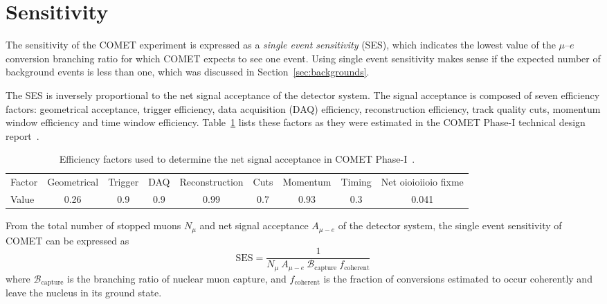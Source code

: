 
\section{Sensitivity}\label{sec:SES}

The sensitivity of the COMET experiment is expressed as a \emph{single event
sensitivity} (SES), which indicates the lowest value of the $\mu$--$e$
conversion branching ratio for which COMET expects to see one event. Using
single event sensitivity makes sense if the expected number of background events
is less than one, which was discussed in Section~\ref{sec:backgrounds}.

The SES is inversely proportional to the net signal acceptance of the detector
system. The signal acceptance is composed of seven efficiency factors:
geometrical acceptance, trigger efficiency, data acquisition (DAQ) efficiency,
reconstruction efficiency, track quality cuts, momentum window efficiency and
time window efficiency. Table~\ref{tab:acceptance} lists these factors as they
were estimated in the COMET Phase-I technical design
report~\cite{the_comet_collaboration_comet_2020}.

\begin{table}
    \centering
    \begin{tabular}{l|ccccccc|c}
        \toprule
        Factor & Geometrical & Trigger & DAQ & Reconstruction & Cuts & Momentum
        & Timing & Net oioioiioio fixme
        \\ 
        Value & 0.26 & 0.9 & 0.9 & 0.99 & 0.7 & 0.93 & 0.3 & 0.041 \\
        \bottomrule
    \end{tabular}
    \caption{ Efficiency factors used to determine the net signal acceptance in
    COMET Phase-I~\cite{the_comet_collaboration_comet_2020}.}
    \label{tab:acceptance} 
\end{table}

From the total number of stopped muons $N_\mu$ and net signal acceptance
$A_{\mu-e}$ of the detector system, the single event sensitivity of COMET can be
expressed as
\begin{equation}
    \mathrm{SES} = \frac{1}{N_\mu \  A_{\mu-e} \  
    \mathcal{B}_\mathrm{capture} \  f_\mathrm{coherent}}
\end{equation}
where $\mathcal{B}_\mathrm{capture}$ is the branching ratio of nuclear muon capture,
and $f_\mathrm{coherent}$ is the fraction of conversions estimated to occur
coherently and leave the nucleus in its ground state.



